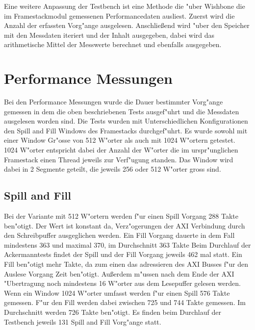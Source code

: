 Eine weitere Anpassung der Testbench ist eine Methode die "uber Wishbone die im Framestackmodul gemessenen Performancedaten ausliest.  Zuerst wird die Anzahl der erfassten Vorg"ange ausgelesen. Anschließend wird "uber den Speicher mit den Messdaten iteriert und der Inhalt ausgegeben, dabei wird das arithmetische Mittel der Messwerte berechnet und ebenfalls ausgegeben. 


\section{Performance Messungen}
Bei den Performance Messungen wurde die Dauer bestimmter Vorg"ange gemessen in dem die oben beschriebenen Tests ausgef"uhrt und die Messdaten ausgelesen worden sind. 
Die Tests wurden mit Unterschiedlichen Konfigurationen den Spill and Fill Windows des Framestacks durchgef"uhrt. Es wurde sowohl mit einer Window Gr"o{ss}e von 512 W"orter als auch mit 1024 W"ortern getestet. 1024 W"orter entspricht dabei der Anzahl der W"orter die im urspr"unglichen Framestack einen Thread jeweils zur Verf"ugung standen. Das Window wird dabei in 2 Segmente geteilt, die jeweils 256 oder 512 W"orter gro{ss} sind.

\subsection{Spill and Fill}

Bei der Variante mit 512 W"ortern werden f"ur einen Spill Vorgang 288 Takte ben"otigt. Der Wert ist konstant da, Verz"ogerungen der AXI Verbindung durch den Schreibpuffer ausgeglichen werden. Ein Fill Vorgang dauerte in dem Fall mindestens 363 und maximal 370, im Durchschnitt 363 Takte 
Beim Durchlauf der Ackermanntests findet der Spill und der Fill Vorgang jeweils 462 mal statt. 
Ein Fill ben"otigt mehr Takte, da zum einen das adressieren des AXI Busses f"ur den Auslese Vorgang Zeit ben"otigt. Außerdem m"ussen nach dem Ende der AXI "Ubertragung noch mindestens 16 W"orter aus dem Lesepuffer gelesen werden.  
Wenn ein Window 1024 W"orter umfasst werden f"ur einen Spill 576 Takte gemessen. F"ur den Fill werden dabei zwischen 725 und 744 Takte gemessen. Im Durchschnitt werden 726 Takte ben"otigt. 
Es finden beim Durchlauf der Testbench jeweils 131 Spill and Fill Vorg"ange statt. 
